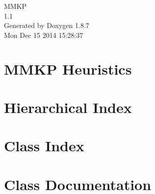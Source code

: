 \documentclass[twoside]{book}
\newcommand{\+}{\discretionary{\mbox{\scriptsize$\hookleftarrow$}}{}{}}
\newcommand{\clearemptydoublepage}{%
  \newpage{\pagestyle{empty}\cleardoublepage}%
}
\begin{document}
\hypersetup{pageanchor=false,
             bookmarks=true,
             bookmarksnumbered=true,
             pdfencoding=unicode
            }
\begin{titlepage}
\vspace*{7cm}
\begin{center}%
{\Large M\+M\+K\+P \\[1ex]\large 1.\+1 }\\
\vspace*{1cm}
{\large Generated by Doxygen 1.8.7}\\
\vspace*{0.5cm}
{\small Mon Dec 15 2014 15:28:37}\\
\end{center}
\end{titlepage}
\clearemptydoublepage
\tableofcontents
\clearemptydoublepage
{}
\hypersetup{pageanchor=true}

\chapter{M\+M\+K\+P Heuristics}
\label{index}\hypertarget{index}{}
\chapter{Hierarchical Index}

\chapter{Class Index}

\chapter{Class Documentation}

































\newpage
{}
{}
\printindex
\end{document}
